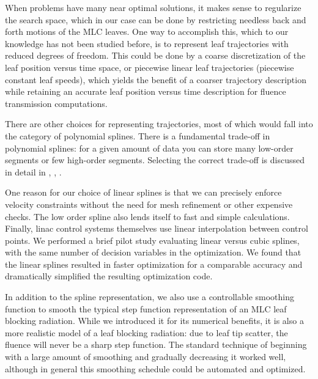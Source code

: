 \documentclass{iopart}
\begin{document}
When problems have many near optimal solutions, it makes sense to regularize the search space, which in our case can be done by restricting needless back and forth motions of the MLC leaves. One way to accomplish this, which to our knowledge has not been studied before, is to represent leaf trajectories with reduced degrees of freedom. This could be done by a coarse discretization of the leaf position versus time space, or piecewise linear leaf trajectories (piecewise constant leaf speeds), which yields the benefit of a coarser trajectory description while retaining an accurate leaf position versus time description for fluence transmission computations.

There are other choices for representing trajectories, most of which would fall into the category of polynomial splines. There is a fundamental trade-off in polynomial splines: for a given amount of data you can store many low-order segments or few high-order segments. Selecting the correct trade-off is discussed in detail in \cite{kelly2017introduction}, \cite{Betts2010}, \cite{Darby2011a}. 

One reason for our choice of linear splines is that we can precisely enforce velocity constraints without the need for mesh refinement or other expensive checks. The low order spline also lends itself to fast and simple calculations. Finally, linac control systems themselves use linear interpolation between control points. We performed a brief pilot study evaluating linear versus cubic splines, with the same number of decision variables in the optimization. We found that the linear splines resulted in faster optimization for a comparable accuracy and dramatically simplified the resulting optimization code.

In addition to the spline representation, we also use a controllable smoothing function to smooth the typical step function representation of an MLC leaf blocking radiation. While we introduced it for its numerical benefits, it is also a more realistic model of a leaf blocking radiation: due to leaf tip scatter, the fluence will never be a sharp step function. The standard technique of beginning with a large amount of smoothing and gradually decreasing it worked well, although in general this smoothing schedule could be automated and optimized.
\end{document}
